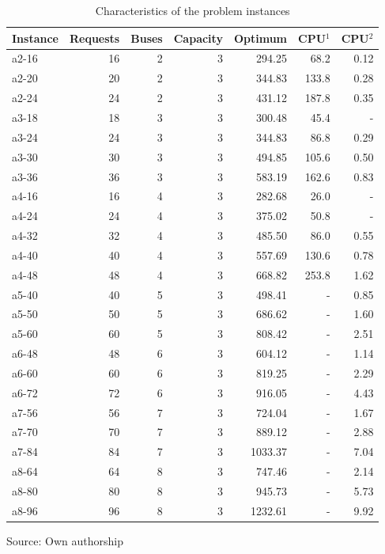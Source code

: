 \documentclass[tuberlin,cic,tc,openright,english,noabntcite,oneside]{iiufrgs}
\begin{document}
\begin{table}[H]
\centering
\caption{Characteristics of the problem instances}
\begin{tabular}{l | r | r | r | r | r | r}
\hline
Instance & Requests & Buses & Capacity & Optimum & CPU$^1$ & CPU$^2$ \\
\hline
a2-16 & 	16 & 	2 & 	3 & 	294.25 & 	68.2 & 	0.12\\
a2-20 & 	20 & 	2 & 	3 & 	344.83 & 	133.8 & 	0.28\\
a2-24 & 	24 & 	2 & 	3 & 	431.12 & 	187.8 & 	0.35\\
a3-18 & 	18 & 	3 & 	3 & 	300.48 & 	45.4 & 	-\\
a3-24 & 	24 & 	3 & 	3 & 	344.83 & 	86.8 & 	0.29\\
a3-30 & 	30 & 	3 & 	3 & 	494.85 & 	105.6 & 	0.50\\
a3-36 & 	36 & 	3 & 	3 & 	583.19 & 	162.6 & 	0.83\\
a4-16 & 	16 & 	4 & 	3 & 	282.68 & 	26.0 & 	-\\
a4-24 & 	24 & 	4 & 	3 & 	375.02 & 	50.8 & 	-\\
a4-32 & 	32 & 	4 & 	3 & 	485.50 & 	86.0 & 	0.55\\
a4-40 & 	40 & 	4 & 	3 & 	557.69 & 	130.6 & 	0.78\\
a4-48 & 	48 & 	4 & 	3 & 	668.82 & 	253.8 & 	1.62\\
a5-40 & 	40 & 	5 & 	3 & 	498.41 & 	- & 	0.85\\
a5-50 & 	50 & 	5 & 	3 & 	686.62 & 	- & 	1.60\\
a5-60 & 	60 & 	5 & 	3 & 	808.42 & 	- & 	2.51\\
a6-48 & 	48 & 	6 & 	3 & 	604.12 & 	- & 	1.14\\
a6-60 & 	60 & 	6 & 	3 & 	819.25 & 	- & 	2.29\\
a6-72 & 	72 & 	6 & 	3 & 	916.05 & 	- & 	4.43\\
a7-56 & 	56 & 	7 & 	3 & 	724.04 & 	- & 	1.67\\
a7-70 & 	70 & 	7 & 	3 & 	889.12 & 	- & 	2.88\\
a7-84 & 	84 & 	7 & 	3 & 	1033.37 & 	- & 	7.04\\
a8-64 & 	64 & 	8 & 	3 & 	747.46 & 	- & 	2.14\\
a8-80 & 	80 & 	8 & 	3 & 	945.73 & 	- & 	5.73\\
a8-96 & 	96 & 	8 & 	3 & 	1232.61 & 	- & 	9.92\\
\hline
\end{tabular}
\center Source: Own authorship
\label{tab:instances-attributes}
\end{table}
\end{document}
